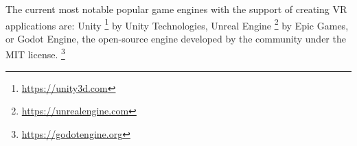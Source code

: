 The current most notable popular game engines with the support of creating VR
applications are: Unity \footnote{\href{https://unity3d.com}{https://unity3d.com}} by
Unity Technologies, Unreal Engine \footnote{\href{https://unrealengine.com}{https://unrealengine.com}} by
Epic Games, or Godot Engine, the open-source engine developed by the community
under the MIT license. \footnote{\href{https://godotengine.org}{https://godotengine.org}} \hyperlink{slantvr}{}
